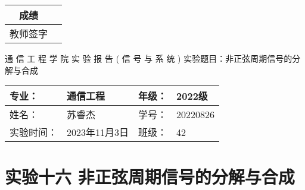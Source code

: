 \documentclass[dvipsnames, svgnames,a4paper,11pt]{article}
\begin{document}
\begin{table}
  \raggedleft
	\renewcommand\arraystretch{1.7}
	\begin{tabular}{|c|p{4em}|}
	\hline
	成绩 &  \\
	\hline
	教师签字 &   \\
	\hline
	\end{tabular}
\end{table}

\begin{center}
	{\kaishu \LARGE   \quad  \quad 通  \quad 信  \quad 工  \quad 程  \quad 学  \quad 院 }
  \newline
  \newline
  \newline
  \newline
  \newline
  {\kaishu \Huge 实 \quad  \quad  \quad 验  \quad  \quad  \quad 报 \quad  \quad  \quad 告}
  \newline
  \newline
  \newline
  \newline
  \newline
  {\songti \Huge  ( \quad  信  \quad 号  \quad 与  \quad 系  \quad 统 \quad)}
  \newline
  \newline
  \newline
  \newline
  \newline
  {\songti  \LARGE 实验题目：非正弦周期信号的分解与合成  \quad  \quad \quad}
\end{center}



\begin{table}[b]
	\renewcommand\arraystretch{1.7}
	\begin{tabularx}{\textwidth}{|X|X|X|X|}
	\hline
	专业：& 通信工程 &年级：& 2022级\\
	\hline
	姓名：& 苏睿杰  & 学号：& 20220826\\
	\hline
	实验时间：& 2023年11月3日 & 班级：& 42 \\
	\hline
	\end{tabularx}
\end{table}



\clearpage
\setcounter{section}{0}
\section{实验十六 \quad 非正弦周期信号的分解与合成}
\end{document}
